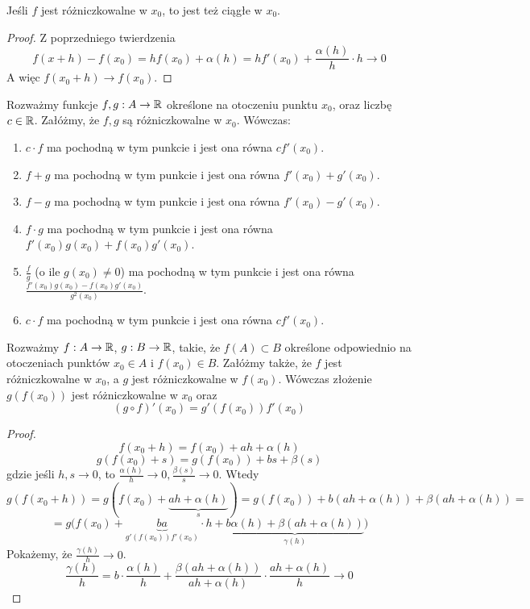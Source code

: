 \documentclass[9pt]{article}
\begin{document}
\begin{Wni}
    Jeśli $f$ jest różniczkowalne w $x_0$, to jest też ciągłe w $x_0$.
\end{Wni}

\begin{proof}
    Z poprzedniego twierdzenia
    \[
        f(x+h) - f(x_0) = h f(x_0) + \alpha(h) = h f'(x_0) + \frac{\alpha(h)}{h} \cdot h \to
        0
    \]
    A więc $f(x_0+h) \to f(x_0)$.
\end{proof}

\begin{Twi}
    Rozważmy funkcje $f, g: A \to \mathbb{R}$ określone na otoczeniu punktu $x_0$, oraz liczbę $c \in \mathbb{R}$.
    Załóżmy, że $f, g$ są różniczkowalne w $x_0$. Wówczas:
    \begin{enumerate}
        \item $c \cdot f$ ma pochodną w tym punkcie i jest ona równa $c f'(x_0)$.
        \item $f + g$ ma pochodną w tym punkcie i jest ona równa $f'(x_0) + g'(x_0)$.
        \item $f - g$ ma pochodną w tym punkcie i jest ona równa $f'(x_0) - g'(x_0)$.
        \item $f \cdot g$ ma pochodną w tym punkcie i jest ona równa $f'(x_0) g(x_0) + f(x_0)
            g'(x_0)$.
        \item $\frac{f}{g}$ (o ile $g(x_0) \ne 0$) ma pochodną w tym punkcie i jest ona równa
            $\frac{f'(x_0) g(x_0) - f(x_0) g'(x_0)}{g^2(x_0)}$.
        \item $c \cdot f$ ma pochodną w tym punkcie i jest ona równa $c f'(x_0)$.
    \end{enumerate}
\end{Twi}

\begin{Twi}
    Rozważmy $f: A \to \mathbb{R}$, $g: B \to \mathbb{R}$, takie, że $f(A) \subset B$ określone odpowiednio na
    otoczeniach punktów $x_0 \in A$ i $f(x_0) \in B$. Załóżmy także, że $f$ jest różniczkowalne w
    $x_0$, a $g$ jest różniczkowalne w $f(x_0)$. Wówczas złożenie $g(f(x_0))$ jest różniczkowalne w
    $x_0$ oraz
    \[
        (g \circ f)' (x_0) = g'(f(x_0)) f'(x_0)
    \]
\end{Twi}

\begin{proof}
    \[
        f (x_0+h) = f(x_0) + ah + \alpha(h)
    \]
    \[
        g (f(x_0)+s) = g(f(x_0)) + bs + \beta(s)
    \]
    gdzie jeśli $h, s \to 0$, to $\frac{\alpha(h)}{h} \to 0, \frac{\beta(s)}{s} \to 0$. Wtedy
    \[
        g (f (x_0+h)) = g(f(x_0)+ \underbrace{ah+\alpha(h)}_{s}) =
        g(f(x_0)) + b(ah + \alpha(h)) + \beta (ah + \alpha(h)) =
    \]
    \[
        =
        g\bigg(f(x_0) + \underbrace{ba}_{g'(f(x_0))f'(x_0)} \cdot h +
        \underbrace{b \alpha(h) + \beta (ah + \alpha(h))}_{\gamma(h)}\bigg)
    \]
    Pokażemy, że $\frac{\gamma(h)}{h} \to 0$.
    \[
        \frac{\gamma(h)}{h} = b \cdot \frac{\alpha(h)}{h} +
        \frac{\beta (ah + \alpha(h))}{ah+\alpha(h)} \cdot
        \frac{ah + \alpha(h)}{h} \to 0
    \]
\end{proof}
\end{document}
